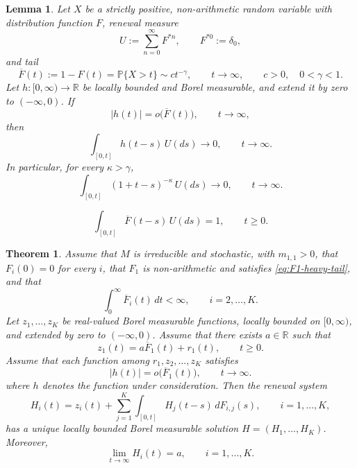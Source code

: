 \documentclass[10pt,a4paper]{amsart}
\newtheorem{lemma}{Lemma}
\newtheorem{theorem}{Theorem}
\newcommand{\Pbb}{\mathbb P}
\newcommand{\R}{\mathbb R}
\begin{document}
\begin{lemma}\label{lem:infinite-mean-renewal-negligibility}
Let \(X\) be a strictly positive, non-arithmetic random variable with distribution function \(F\), renewal measure
\[
  U:=\sum_{n=0}^{\infty}F^{*n},
  \qquad F^{*0}:=\delta_0,
\]
and tail
\[
  \overline F(t):=1-F(t)=\Pbb\{X>t\}
  \sim ct^{-\gamma},
  \qquad t\to\infty,
  \qquad c>0,\quad 0<\gamma<1.
\]
Let \(h:[0,\infty)\to\R\) be locally bounded and Borel measurable, and extend it by zero to \((-\infty,0)\). If
\begin{equation}\label{eq:renewal-small-relative-tail}
  |h(t)|=o\bigl(\overline F(t)\bigr),
  \qquad t\to\infty,
\end{equation}
then
\begin{equation}\label{eq:renewal-negligibility-X}
  \int_{[0,t]}h(t-s)\,U(ds)\longrightarrow0,
  \qquad t\to\infty.
\end{equation}
In particular, for every \(\kappa>\gamma\),
\begin{equation}\label{eq:renewal-power-negligibility-X}
  \int_{[0,t]}(1+t-s)^{-\kappa}\,U(ds)\longrightarrow0,
  \qquad t\to\infty.
\end{equation}
\end{lemma}

\begin{equation}\label{eq:renewal-tail-identity-general}
  \int_{[0,t]}\overline F(t-s)\,U(ds)=1,
  \qquad t\ge0.
\end{equation}

\begin{theorem}\label{thm:mixed-renewal}
Assume that \(M\) is irreducible and stochastic, with \(m_{1,1}>0\), that \(F_i(0)=0\) for every \(i\), that \(F_1\) is non-arithmetic and satisfies \eqref{eq:F1-heavy-tail}, and that
\[
  \int_0^\infty\overline F_i(t)\,dt<\infty,
  \qquad i=2,\dots,K.
\]
Let \(z_1,\dots,z_K\) be real-valued Borel measurable functions, locally bounded on \([0,\infty)\), and extended by zero to \((-\infty,0)\). Assume that there exists \(a\in\R\) such that
\begin{equation}\label{eq:z1-decomp-renewal}
  z_1(t)=a\overline F_1(t)+r_1(t),
  \qquad t\ge0.
\end{equation}
Assume that each function among \(r_1,z_2,\dots,z_K\) satisfies
\begin{equation*}\tag{H}
  |h(t)|=o\bigl(\overline F_1(t)\bigr),
  \qquad t\to\infty.
\end{equation*}
where \(h\) denotes the function under consideration.
Then the renewal system
\begin{equation}\label{eq:mixed-renewal-system-final}
  H_i(t)
  =
  z_i(t)
  +
  \sum_{j=1}^K
  \int_{[0,t]}H_j(t-s)\,dF_{i,j}(s),
  \qquad i=1,\dots,K,
\end{equation}
has a unique locally bounded Borel measurable solution \(H=(H_1,\dots,H_K)\). Moreover,
\begin{equation}\label{eq:mixed-renewal-limit-final}
  \lim_{t\to\infty}H_i(t)=a,
  \qquad i=1,\dots,K.
\end{equation}
\end{theorem}
\end{document}
